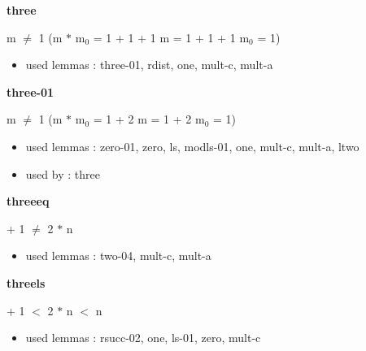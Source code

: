 \documentclass[a4paper]{article}
\begin{document}
\medskip

\bigskip

{\large\bf three}

\medskip

 \Fol m $\neq$ 1 \Imp (m $*$ $\mbox{m}_{0}$ = 1 + 1 + 1 \Equiv m = 1 + 1 + 1 \And $\mbox{m}_{0}$ = 1)

\begin{itemize}


\item       used lemmas  : three-01, rdist, one, mult-c, mult-a

\end{itemize}

\medskip

\bigskip

{\large\bf three-01}

\medskip

 \Fol m $\neq$ 1 \Imp (m $*$ $\mbox{m}_{0}$ = 1 + 2 \Equiv m = 1 + 2 \And $\mbox{m}_{0}$ = 1)

\begin{itemize}


\item       used lemmas  : zero-01, zero, ls, modls-01, one, mult-c, mult-a, ltwo
\item       used by      : three

\end{itemize}

\medskip

\bigskip

{\large\bf threeeq}

\medskip

  + 1 $\neq$ 2 $*$ n

\begin{itemize}


\item       used lemmas  : two-04, mult-c, mult-a

\end{itemize}

\medskip

\bigskip

{\large\bf threels}

\medskip

  + 1 $<$ 2 $*$ n  $<$ n

\begin{itemize}


\item       used lemmas  : rsucc-02, one, ls-01, zero, mult-c

\end{itemize}
\end{document}

